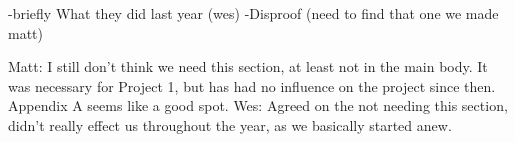 \color{red}
-briefly What they did last year (wes) 
-Disproof (need to find that one we made matt)

Matt: I still don't think we need this section, at least not in the main body. It was necessary for Project 1, but has had no influence on the project since then. Appendix A seems like a good spot.
Wes: Agreed on the not needing this section, didn't really effect us throughout the year, as we basically started anew.
\color{black}
